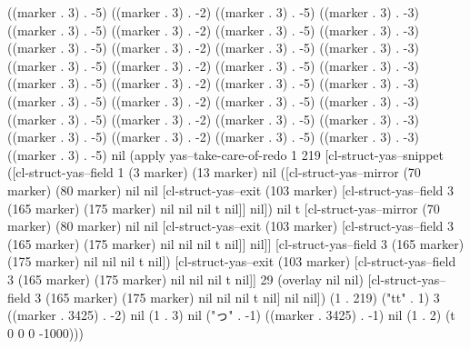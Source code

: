 ((marker . 3) . -5) ((marker . 3) . -2) ((marker . 3) . -5) ((marker . 3) . -3) ((marker . 3) . -5) ((marker . 3) . -2) ((marker . 3) . -5) ((marker . 3) . -3) ((marker . 3) . -5) ((marker . 3) . -2) ((marker . 3) . -5) ((marker . 3) . -3) ((marker . 3) . -5) ((marker . 3) . -2) ((marker . 3) . -5) ((marker . 3) . -3) ((marker . 3) . -5) ((marker . 3) . -2) ((marker . 3) . -5) ((marker . 3) . -3) ((marker . 3) . -5) ((marker . 3) . -2) ((marker . 3) . -5) ((marker . 3) . -3) ((marker . 3) . -5) ((marker . 3) . -2) ((marker . 3) . -5) ((marker . 3) . -3) ((marker . 3) . -5) ((marker . 3) . -2) ((marker . 3) . -5) ((marker . 3) . -3) ((marker . 3) . -5) nil (apply yas--take-care-of-redo 1 219 [cl-struct-yas--snippet ([cl-struct-yas--field 1 (3 marker) (13 marker) nil ([cl-struct-yas--mirror (70 marker) (80 marker) nil nil [cl-struct-yas--exit (103 marker) [cl-struct-yas--field 3 (165 marker) (175 marker) nil nil nil t nil]] nil]) nil t [cl-struct-yas--mirror (70 marker) (80 marker) nil nil [cl-struct-yas--exit (103 marker) [cl-struct-yas--field 3 (165 marker) (175 marker) nil nil nil t nil]] nil]] [cl-struct-yas--field 3 (165 marker) (175 marker) nil nil nil t nil]) [cl-struct-yas--exit (103 marker) [cl-struct-yas--field 3 (165 marker) (175 marker) nil nil nil t nil]] 29 (overlay nil nil) [cl-struct-yas--field 3 (165 marker) (175 marker) nil nil nil t nil] nil nil]) (1 . 219) ("tt" . 1) 3 ((marker . 3425) . -2) nil (1 . 3) nil ("っ" . -1) ((marker . 3425) . -1) nil (1 . 2) (t 0 0 0 -1000)))
